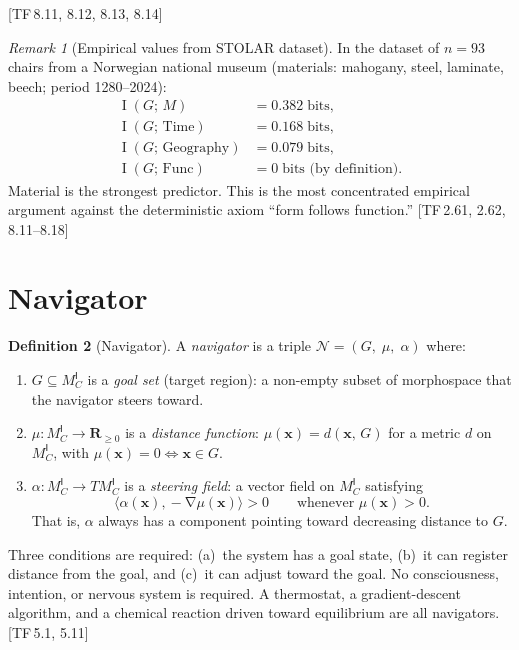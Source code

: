 \documentclass[10pt]{article}
\theoremstyle{definition}
\newtheorem{definition}{Definition}[section]
\theoremstyle{plain}
\theoremstyle{remark}
\newtheorem{remark}[definition]{Remark}
\newcommand{\MC}{M^{\mathsf{I}}_C}          %
\providecommand{\R}{}
\renewcommand{\R}{\mathbf{R}}               %
\newcommand{\Nav}{\mathcal{N}}               %
\newcommand{\inner}[2]{\langle #1, #2 \rangle}
\DeclareMathOperator{\grad}{\nabla}
\DeclareMathOperator{\MI}{I}                 %
\newcommand{\TF}[1]{\textnormal{[TF\,#1]}}  %
\begin{document}
\TF{8.11, 8.12, 8.13, 8.14}

\begin{remark}[Empirical values from STOLAR dataset]
In the dataset of $n = 93$ chairs from a Norwegian national museum
(materials: mahogany, steel, laminate, beech; period 1280--2024):
\begin{align*}
  \MI(G;\, M) &= 0.382 \;\text{bits}, \\
  \MI(G;\, \mathrm{Time}) &= 0.168 \;\text{bits}, \\
  \MI(G;\, \mathrm{Geography}) &= 0.079 \;\text{bits}, \\
  \MI(G;\, \mathrm{Func}) &= 0 \;\text{bits (by definition).}
\end{align*}
Material is the strongest predictor. This is the most concentrated
empirical argument against the deterministic axiom ``form follows
function.'' \TF{2.61, 2.62, 8.11--8.18}
\end{remark}

\newpage
\section{Navigator}\label{sec:navigator}

\begin{definition}[Navigator]\label{def:6.1}
A \emph{navigator} is a triple
$\Nav = (G,\; \mu,\; \alpha)$
where:
\begin{enumerate}[label=(\alph*),nosep]
  \item $G \subseteq \MC$ is a \emph{goal set} (target region): a
    non-empty subset of morphospace that the navigator steers toward.
  \item $\mu : \MC \to \R_{\geq 0}$ is a \emph{distance function}:
    $\mu(\bm{x}) = d(\bm{x},\, G)$ for a metric $d$ on $\MC$, with
    $\mu(\bm{x}) = 0 \iff \bm{x} \in G$.
  \item $\alpha : \MC \to T\MC$ is a \emph{steering field}: a vector
    field on $\MC$ satisfying
    \[
      \inner{\alpha(\bm{x})}{\!-\grad\mu(\bm{x})} > 0
      \qquad \text{whenever } \mu(\bm{x}) > 0.
    \]
    That is, $\alpha$ always has a component pointing toward decreasing
    distance to $G$.
\end{enumerate}

\medskip\noindent
Three conditions are required: (a)~the system has a goal state,
(b)~it can register distance from the goal, and (c)~it can adjust
toward the goal. No consciousness, intention, or nervous system is
required. A thermostat, a gradient-descent algorithm, and a chemical
reaction driven toward equilibrium are all navigators. \TF{5.1, 5.11}
\end{definition}
\end{document}
